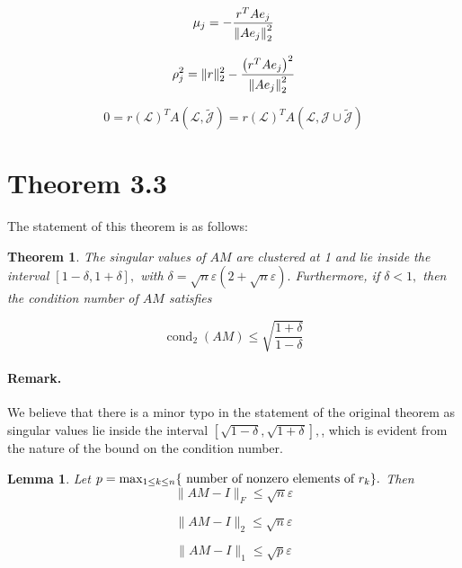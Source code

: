 \documentclass[paper=A4, fontsize=11pt]{scrartcl}
\let\originalleft\left
\let\originalright\right
\renewcommand{\left}{\mathopen{}\mathclose\bgroup\originalleft}
\renewcommand{\right}{\aftergroup\egroup\originalright}
\newtheorem{lemma}{Lemma}
\newtheorem{theorem}{Theorem}
\begin{document}
	\begin{equation}
	\mu_{j}=-\frac{r^{T} A e_{j}}{\left\|A e_{j}\right\|_{2}^{2}}
	\end{equation}
	
	\begin{equation}
	\rho_{j}^{2}=\|r\|_{2}^{2}-\frac{\left(r^{T} A e_{j}\right)^{2}}{\left\|A e_{j}\right\|_{2}^{2}}
	\end{equation}
	
	\begin{equation}
	0=r(\mathcal{L})^{T} A(\mathcal{L}, \tilde{\mathcal{J}})=r(\mathcal{L})^{T} A(\mathcal{L}, \mathcal{J} \cup \tilde{\mathcal{J}})
	\end{equation}
	
	\newpage

\section{Theorem 3.3}

The statement of this theorem is as follows: 
\begin{theorem}
The singular values of \(A M\) are clustered at 1 and lie inside the
interval \([1-\delta, 1+\delta],\) with \(\delta=\sqrt{n} \varepsilon(2+\sqrt{n} \varepsilon) .\) Furthermore, if \(\delta<1,\) then the
condition number of \(A M\) satisfies

\begin{equation}
\operatorname{cond}_{2}(A M) \leq \sqrt{\frac{1+\delta}{1-\delta}}
\end{equation}


\end{theorem}

\paragraph{Remark.} We believe that there is a minor typo in the statement of the original theorem as singular values lie inside the interval  \([\sqrt{1-\delta}, \sqrt{1+\delta}],\), which is evident from the nature of the bound on the condition number. 


\begin{lemma}
Let \(p=\max _{1 \leq k \leq n}\left\{\text { number of nonzero elements of } r_{k}\right\} .\) Then
\begin{equation}
\|A M-I\|_{F} \leq \sqrt{n} \varepsilon \label{lem1a}
\end{equation}

\begin{equation}
\|A M-I\|_{2} \leq \sqrt{n} \varepsilon \label{lem1b}
\end{equation}

\begin{equation}
\|A M-I\|_{1} \leq \sqrt{p} \varepsilon \label{lem1c}
\end{equation}
\end{lemma}
\end{document}
